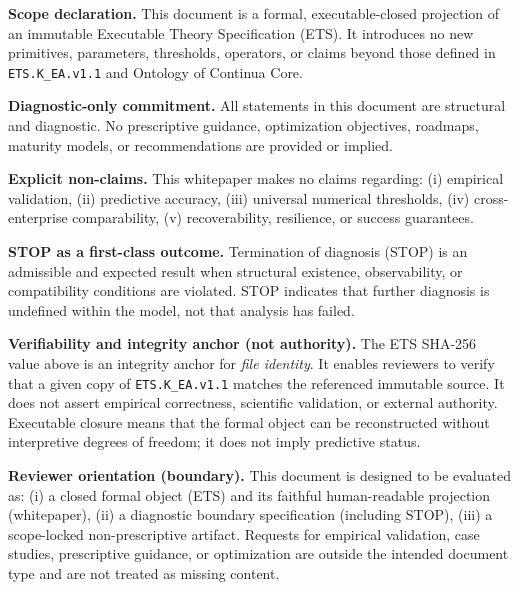 \vspace{4mm}

\noindent\textbf{Scope declaration.}
This document is a formal, executable-closed projection of an immutable
Executable Theory Specification (ETS).
It introduces no new primitives, parameters, thresholds, operators, or
claims beyond those defined in \texttt{ETS.K\_EA.v1.1} and Ontology of
Continua Core.

\vspace{2mm}

\noindent\textbf{Diagnostic-only commitment.}
All statements in this document are structural and diagnostic.
No prescriptive guidance, optimization objectives, roadmaps, maturity
models, or recommendations are provided or implied.

\vspace{2mm}

\noindent\textbf{Explicit non-claims.}
This whitepaper makes no claims regarding:
(i) empirical validation,
(ii) predictive accuracy,
(iii) universal numerical thresholds,
(iv) cross-enterprise comparability,
(v) recoverability, resilience, or success guarantees.

\vspace{2mm}

\noindent\textbf{STOP as a first-class outcome.}
Termination of diagnosis (STOP) is an admissible and expected result
when structural existence, observability, or compatibility conditions
are violated.
STOP indicates that further diagnosis is undefined within the model,
not that analysis has failed.

\vspace{3mm}

\noindent\textbf{Verifiability and integrity anchor (not authority).}
The ETS SHA-256 value above is an integrity anchor for \emph{file identity}.
It enables reviewers to verify that a given copy of
\texttt{ETS.K\_EA.v1.1} matches the referenced immutable source.
It does not assert empirical correctness, scientific validation, or
external authority.
Executable closure means that the formal object can be reconstructed
without interpretive degrees of freedom; it does not imply predictive
status.

\vspace{3mm}

\noindent\textbf{Reviewer orientation (boundary).}
This document is designed to be evaluated as:
(i) a closed formal object (ETS) and its faithful human-readable
projection (whitepaper),
(ii) a diagnostic boundary specification (including STOP),
(iii) a scope-locked non-prescriptive artifact.
Requests for empirical validation, case studies, prescriptive guidance,
or optimization are outside the intended document type and are not
treated as missing content.

